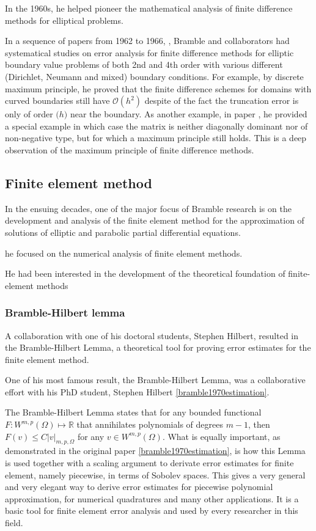 \documentclass[CJK,11pt]{amsart}
\theoremstyle{definition}
\begin{document}
\begin{CJK*}{UTF8}{gbsn}
In the 1960s, he helped pioneer the mathematical analysis of finite difference methods for elliptical problems. 

In a sequence of papers from 1962 to 1966, \cite{bramble1962formulation, bramble1963fourth, bramble1964finite, bramble1965finite,bramble1965approximation,bramble1966second,bramble1966error}, Bramble and collaborators had systematical studies on error analysis for finite difference methods for elliptic boundary value problems of both 2nd and 4th order with various different (Dirichlet, Neumann and mixed) boundary conditions.  For example, by discrete maximum principle, he proved that the finite difference schemes for domains with curved boundaries still have $\mathcal O(h^2)$ despite of the fact the truncation error is only of order $\mathcal (h)$ near the boundary.  As another example, in paper \cite{bramble1964finite}, he provided a special example in which case the matrix is neither diagonally dominant nor of non-negative type, but for which a maximum principle still holds. This is a deep observation of the maximum principle of finite difference methods.

%

\subsection{Finite element method}
In the ensuing decades, one of the major focus of Bramble research is on the development and analysis of the finite element method for the approximation of solutions of elliptic and parabolic partial differential equations.


he focused on the numerical analysis of finite element methods.

He had been interested in the development of the theoretical foundation of finite-element methods 

\subsubsection{Bramble-Hilbert lemma}

A collaboration with one of his doctoral students, Stephen Hilbert, resulted in the Bramble-Hilbert Lemma, a theoretical tool for proving error estimates for the finite element method.

One of his most famous result, the Bramble-Hilbert Lemma, was a collaborative effort with his PhD student, Stephen Hilbert \eqref{bramble1970estimation}.

The Bramble-Hilbert Lemma states that for any bounded functional $F:W^{m,p}(\Omega)\mapsto\mathbb R$ that annihilates polynomials of degrees $m-1$, then $F(v)\le C|v|_{m,p,\Omega}$ for any $v\in W^{m,p}(\Omega)$.  What is equally important, as demonstrated in the original paper \eqref{bramble1970estimation}, is how this Lemma is used together with a scaling argument to derivate error estimates for finite element, namely piecewise, 
in terms of Sobolev spaces.  This gives a very general and very elegant way to derive error estimates for piecewise polynomial approximation, for numerical quadratures and many other applications.  It is a basic tool for finite element error analysis and used by every researcher in this field. 



\end{CJK*}
\end{document}
